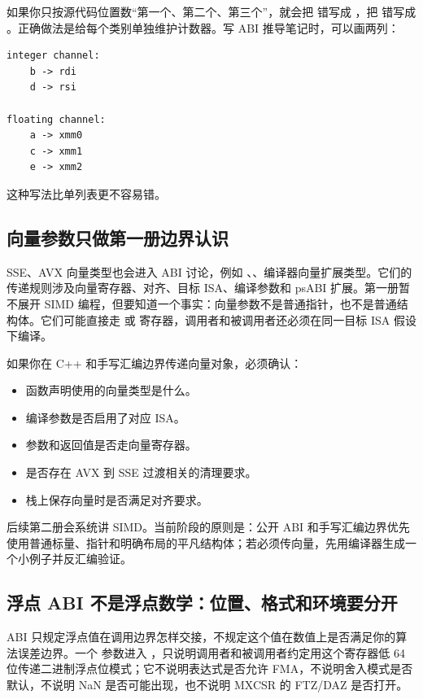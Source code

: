 如果你只按源代码位置数“第一个、第二个、第三个”，就会把  错写成 ，把  错写成 。正确做法是给每个类别单独维护计数器。写 ABI 推导笔记时，可以画两列：

\begin{lstlisting}
integer channel:
    b -> rdi
    d -> rsi

floating channel:
    a -> xmm0
    c -> xmm1
    e -> xmm2
\end{lstlisting}

这种写法比单列表更不容易错。

\subsection{向量参数只做第一册边界认识}

SSE、AVX 向量类型也会进入 ABI 讨论，例如 、、编译器向量扩展类型。它们的传递规则涉及向量寄存器、对齐、目标 ISA、编译参数和 psABI 扩展。第一册暂不展开 SIMD 编程，但要知道一个事实：向量参数不是普通指针，也不是普通结构体。它们可能直接走  或  寄存器，调用者和被调用者还必须在同一目标 ISA 假设下编译。

如果你在 C++ 和手写汇编边界传递向量对象，必须确认：

\begin{itemize}
  \item 函数声明使用的向量类型是什么。
  \item 编译参数是否启用了对应 ISA。
  \item 参数和返回值是否走向量寄存器。
  \item 是否存在 AVX 到 SSE 过渡相关的清理要求。
  \item 栈上保存向量时是否满足对齐要求。
\end{itemize}

后续第二册会系统讲 SIMD。当前阶段的原则是：公开 ABI 和手写汇编边界优先使用普通标量、指针和明确布局的平凡结构体；若必须传向量，先用编译器生成一个小例子并反汇编验证。

\subsection{浮点 ABI 不是浮点数学：位置、格式和环境要分开}

ABI 只规定浮点值在调用边界怎样交接，不规定这个值在数值上是否满足你的算法误差边界。一个  参数进入 ，只说明调用者和被调用者约定用这个寄存器低 64 位传递二进制浮点位模式；它不说明表达式是否允许 FMA，不说明舍入模式是否默认，不说明 NaN 是否可能出现，也不说明 MXCSR 的 FTZ/DAZ 是否打开。

